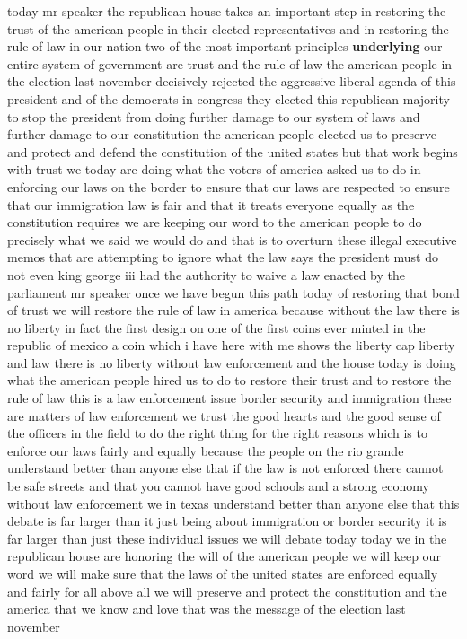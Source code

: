 \documentclass{article}
\begin{document}
today mr speaker the republican house takes an important step in restoring the trust of the american people in their elected representatives and in restoring the rule of law in our nation two of the most important principles {\bf \color{red} underlying} our entire system of government are trust and the rule of law the american people in the election last november decisively rejected the aggressive liberal agenda of this president and of the democrats in congress they elected this republican majority to stop the president from doing further damage to our system of laws and further damage to our constitution the american people elected us to preserve and protect and defend the constitution of the united states but that work begins with trust we today are doing what the voters of america asked us to do in enforcing our laws on the border to ensure that our laws are respected to ensure that our immigration law is fair and that it treats everyone equally as the constitution requires we are keeping our word to the american people to do precisely what we said we would do and that is to overturn these illegal executive memos that are attempting to ignore what the law says the president must do not even king george iii had the authority to waive a law enacted by the parliament mr speaker once we have begun this path today of restoring that bond of trust we will restore the rule of law in america because without the law there is no liberty in fact the first design on one of the first coins ever minted in the republic of mexico a coin which i have here with me shows the liberty cap liberty and law there is no liberty without law enforcement and the house today is doing what the american people hired us to do to restore their trust and to restore the rule of law this is a law enforcement issue border security and immigration these are matters of law enforcement we trust the good hearts and the good sense of the officers in the field to do the right thing for the right reasons which is to enforce our laws fairly and equally because the people on the rio grande understand better than anyone else that if the law is not enforced there cannot be safe streets and that you cannot have good schools and a strong economy without law enforcement we in texas understand better than anyone else that this debate is far larger than it just being about immigration or border security it is far larger than just these individual issues we will debate today today we in the republican house are honoring the will of the american people we will keep our word we will make sure that the laws of the united states are enforced equally and fairly for all above all we will preserve and protect the constitution and the america that we know and love that was the message of the election last november\pagebreak
\end{document}
